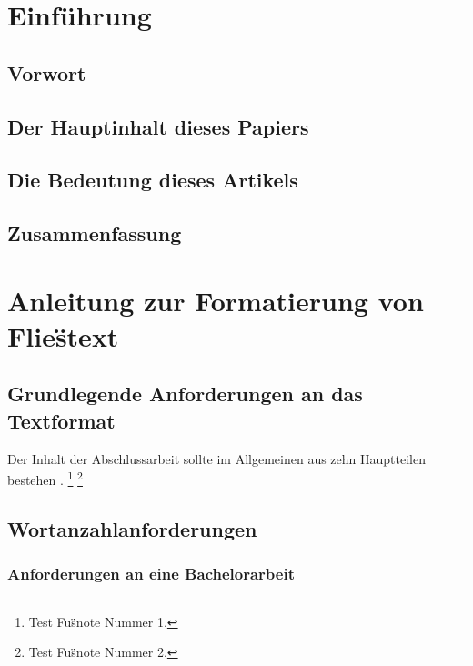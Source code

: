 \chapter{Einf\"uhrung}

\section{Vorwort}

\blindtext[1]

\section{Der Hauptinhalt dieses Papiers}

\blindtext[2]

\section{Die Bedeutung dieses Artikels}

\blindtext[3]

\blindtext[4]

\section{Zusammenfassung}

\blindtext[5]


\chapter{Anleitung zur Formatierung von Flie\"stext}

\section{Grundlegende Anforderungen an das Textformat}

Der Inhalt der Abschlussarbeit sollte im Allgemeinen aus zehn Hauptteilen bestehen
\autocite[11]{Schinstock2000}.
\footnote{Test Fu\"snote Nummer 1.}
\footnote{Test Fu\"snote Nummer 2.}

\section{Wortanzahlanforderungen}

\subsection{Anforderungen an eine Bachelorarbeit}

